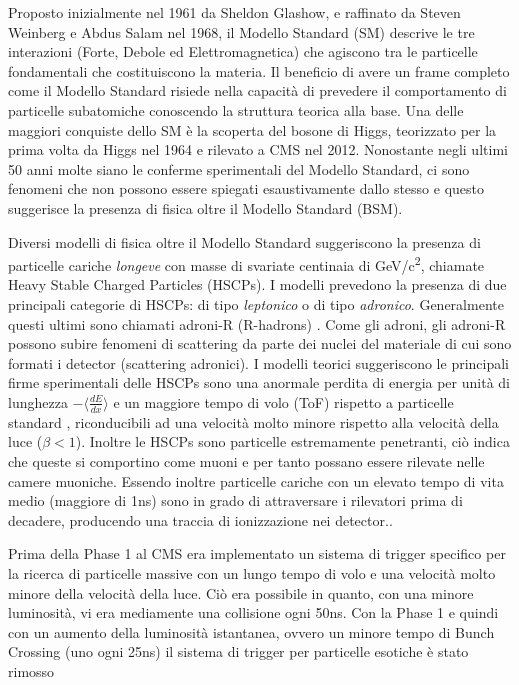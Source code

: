 Proposto inizialmente nel 1961 da Sheldon Glashow, e raffinato da Steven Weinberg e Abdus Salam nel 1968, il Modello Standard (SM) descrive le tre interazioni (Forte, Debole ed Elettromagnetica) che agiscono tra le particelle fondamentali che costituiscono la materia. Il beneficio di avere un frame completo come il Modello Standard risiede nella capacità di prevedere il comportamento di particelle subatomiche conoscendo la struttura teorica alla base. Una delle maggiori conquiste dello SM è la scoperta del bosone di Higgs, teorizzato per la prima volta da Higgs nel 1964 e rilevato a CMS nel 2012. \newline
Nonostante negli ultimi 50 anni molte siano le conferme sperimentali del Modello Standard, ci sono fenomeni che non possono essere spiegati esaustivamente dallo stesso e questo suggerisce la presenza di fisica oltre il Modello Standard (BSM).

Diversi modelli di fisica oltre il Modello Standard suggeriscono la presenza di particelle cariche \textit{longeve} con masse di svariate centinaia di \si{GeV/c^2}, chiamate Heavy Stable Charged Particles (HSCPs). I modelli prevedono la presenza di due principali categorie di HSCPs: di tipo \textit{leptonico} o di tipo \textit{adronico}. Generalmente questi ultimi sono chiamati adroni-R (R-hadrons) \cite{Quertenmont:2010ota}. \newline
Come gli adroni, gli adroni-R possono subire fenomeni di scattering da parte dei nuclei del materiale di cui sono formati i detector (scattering adronici). I modelli teorici suggeriscono le principali firme sperimentali delle HSCPs sono una anormale perdita di energia per unità di lunghezza $- \langle \frac{dE}{dx}\rangle$ e un maggiore tempo di volo (ToF) rispetto a particelle standard \cite{MasterThesisGioMoc}, riconducibili ad una velocità molto minore rispetto alla velocità della luce ($\beta < 1$). Inoltre le HSCPs sono particelle estremamente penetranti, ciò indica che queste si comportino come muoni e per tanto possano essere rilevate nelle camere muoniche. \newline
Essendo inoltre particelle cariche con un elevato tempo di vita medio (maggiore di 1ns) sono in grado di attraversare i rilevatori prima di decadere, producendo una traccia di ionizzazione nei detector..


Prima della Phase 1 al CMS era implementato un sistema di trigger specifico per la ricerca di particelle massive con un lungo tempo di volo e una velocità molto minore della velocità della luce. Ciò era possibile in quanto, con una minore luminosità, vi era mediamente una collisione ogni 50ns. Con la Phase 1 e quindi con un aumento della luminosità istantanea, ovvero un minore tempo di Bunch Crossing (uno ogni 25ns) il sistema di trigger per particelle esotiche è stato rimosso \cite{MasterThesisGioMoc}